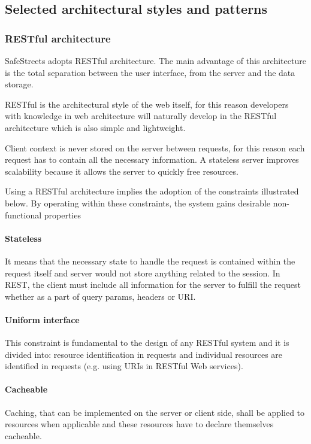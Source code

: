\subsection{Selected architectural styles and patterns}

\subsubsection{RESTful architecture}
SafeStreets adopts RESTful architecture. The main advantage of this architecture is the total separation between the user interface, from the server and the data storage.

RESTful is the architectural style of the web itself, for this reason developers with knowledge in web architecture will naturally develop in the RESTful architecture which is also simple and lightweight.

Client context is never stored on the server between requests, for this reason each request has to contain all the necessary information. 
A stateless server improves scalability because it allows the server to quickly free resources.

Using a RESTful architecture implies the adoption of the constraints illustrated below.
By operating within these constraints, the system gains desirable non-functional properties

\paragraph{Stateless}
It means that the necessary state to handle the request is contained within the request itself and server would not store anything related to the session. In REST, the client must include all information for the server to fulfill the request whether as a part of query params, headers or URI.

\paragraph{Uniform interface}
This constraint is fundamental to the design of any RESTful system and it is divided into:
resource identification in requests and individual resources are identified in requests (e.g. using URIs in RESTful Web services). 

\paragraph{Cacheable}
Caching, that can be implemented on the server or client side, shall be applied to resources when applicable and these resources have to declare themselves cacheable.

